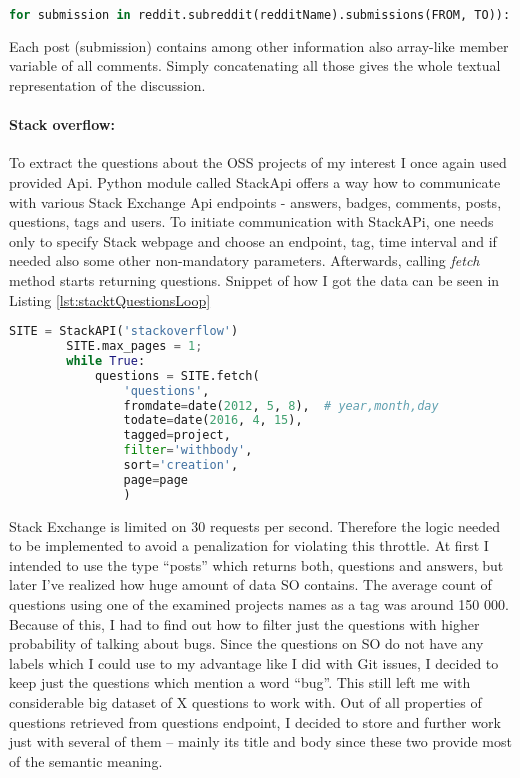 \begin{lstlisting}[caption={Getting posts from subreddit},label={lst:redditSubmissionsLoop},language=Python]
for submission in reddit.subreddit(redditName).submissions(FROM, TO)):
\end{lstlisting}

Each post (submission) contains among other information also array-like member variable of all comments. Simply concatenating all those gives the whole textual representation of the discussion.


\paragraph{Stack overflow:}
To extract the questions about the OSS projects of my interest I once again used provided Api. Python module called StackApi offers a way how to communicate with various Stack Exchange Api endpoints - answers, badges, comments, posts, questions, tags and users. To initiate communication with StackAPi, one needs only to specify Stack webpage and choose an endpoint, tag, time interval and if needed also some other non-mandatory parameters. Afterwards, calling \textit{fetch} method starts returning questions. Snippet of how I got the data can be seen in Listing \ref{lst:stacktQuestionsLoop}

\begin{lstlisting}[caption={Getting Stackoverflow questions with StackApi},label={lst:stacktQuestionsLoop},language=Python]
	SITE = StackAPI('stackoverflow')
    	SITE.max_pages = 1;
    	while True:
    		questions = SITE.fetch(
    			'questions',
    			fromdate=date(2012, 5, 8),  # year,month,day
        		todate=date(2016, 4, 15),
        		tagged=project,
        		filter='withbody',
        		sort='creation',
        		page=page
                )
\end{lstlisting}

Stack Exchange is limited on 30 requests per second. Therefore the logic needed to be implemented to avoid a penalization for violating this throttle. At first I intended to use the type “posts” which returns both, questions and answers, but later I've realized how huge amount of data SO contains.  The average count of questions using one of the examined projects names as a tag was around 150 000. Because of this, I had to find out how to filter just the questions with higher probability of talking about bugs. Since the questions on SO do not have any labels which I could use to my advantage like I did with Git issues, I decided to keep just the questions which mention a word “bug”. This still left me with considerable big dataset of X questions to work with. Out of all properties of questions retrieved from questions endpoint, I decided to store and further work just with several of them – mainly its title and body since these two provide most of the semantic meaning.